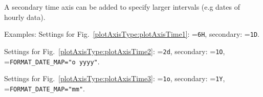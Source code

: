 A secondary time axis can be added to specify larger intervals (e.g dates of hourly data).

Examples: Settings for Fig.~\ref{plotAxisType:plotAxisTime1}: =\verb|6H|, secondary: =\verb|1D|.

Settings for Fig.~\ref{plotAxisType:plotAxisTime2}: =\verb|2d|, secondary: =\verb|1O|, =\verb|FORMAT_DATE_MAP="o yyyy"|.

Settings for Fig.~\ref{plotAxisType:plotAxisTime3}: =\verb|1o|, secondary: =\verb|1Y|, =\verb|FORMAT_DATE_MAP="mm"|.



